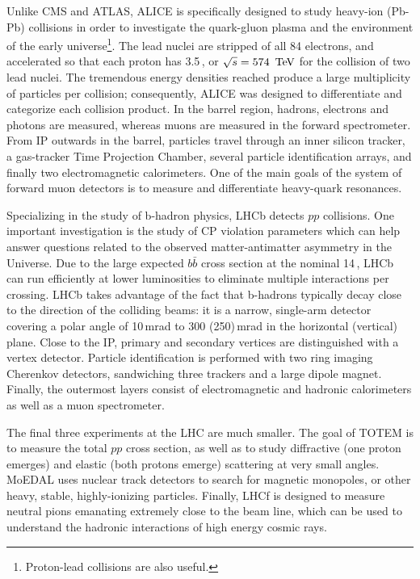 Unlike CMS and ATLAS, ALICE is specifically designed to study heavy-ion (Pb-Pb) collisions in order to investigate the quark-gluon plasma and the environment of the early universe\footnote{Proton-lead collisions are also useful.}. The lead nuclei are stripped of all 84 electrons, and accelerated so that each proton has 3.5\,\TeV, or $\sqrt{s}=574\,\TeV$ for the collision of two lead nuclei. The tremendous energy densities reached produce a large multiplicity of particles per collision; consequently, ALICE was designed to differentiate and categorize each collision product. In the barrel region, hadrons, electrons and photons are measured, whereas muons are measured in the forward spectrometer. From IP outwards in the barrel, particles travel through an inner silicon tracker, a gas-tracker Time Projection Chamber, several particle identification arrays, and finally two electromagnetic calorimeters. One of the main goals of the system of forward muon detectors is to measure and differentiate heavy-quark resonances.

Specializing in the study of b-hadron physics, LHCb detects $pp$ collisions. One important investigation is the study of CP violation parameters which can help answer questions related to the observed matter-antimatter asymmetry in the Universe. Due to the large expected $b\bar{b}$ cross section at the nominal 14\,\TeV, LHCb can run efficiently at lower luminosities to eliminate multiple interactions per crossing.  LHCb takes advantage of the fact that b-hadrons typically decay close to the direction of the colliding beams: it is a narrow, single-arm detector covering a polar angle of 10\,mrad to 300 (250)\,mrad in the horizontal (vertical) plane. Close to the IP, primary and secondary vertices are distinguished with a vertex detector. Particle identification is performed with two ring imaging Cherenkov detectors, sandwiching three trackers and a large dipole magnet. Finally, the outermost layers consist of electromagnetic and hadronic calorimeters as well as a muon spectrometer.

The final three experiments at the LHC are much smaller. The goal of TOTEM is to measure the total $pp$ cross section, as well as to study diffractive (one proton emerges) and elastic (both protons emerge) scattering at very small angles. MoEDAL uses nuclear track detectors to search for magnetic monopoles, or other heavy, stable, highly-ionizing particles. Finally, LHCf is designed to measure neutral pions emanating extremely close to the beam line, which can be used to understand the hadronic interactions of high energy cosmic rays.
\fi
